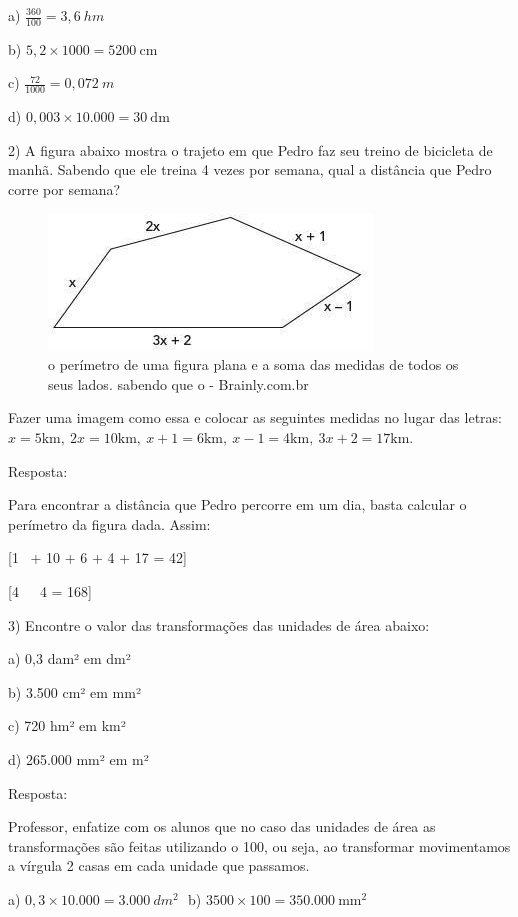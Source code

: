 a) \(\frac{360}{100} = 3,6\ hm\)

b) \(5,2 \times 1000 = 5200\ \text{cm}\)

c) \(\frac{72}{1000} = 0,072\ m\)

d) \(0,003 \times 10.000 = 30\ \text{dm}\)

2) A figura abaixo mostra o trajeto em que Pedro faz seu treino de
bicicleta de manhã. Sabendo que ele treina 4 vezes por semana, qual a
distância que Pedro corre por semana?

\begin{figure}
\centering
\includegraphics[width=3.38542in,height=1.42708in]{./imgSAEB_7_MAT/media/image86.jpg}
\caption{o perímetro de uma figura plana e a soma das medidas de todos
os seus lados. sabendo que o - Brainly.com.br}
\end{figure}

Fazer uma imagem como essa e colocar as seguintes medidas no lugar das
letras:
\(x = 5\text{km},\ 2x = 10\text{km},\ x + 1 = 6\text{km},\ x - 1 = 4\text{km},\ 3x + 2 = 17\text{km}\).

Resposta:

Para encontrar a distância que Pedro percorre em um dia, basta calcular
o perímetro da figura dada. Assim:

[1\   + 10 + 6 + 4 + 17 = 42]

[4\ \  \rightarrow \ 4  = 168]

3) Encontre o valor das transformações das unidades de área abaixo:

a) 0,3 dam² em dm²

b) 3.500 cm² em mm²

c) 720 hm² em km²

d) 265.000 mm² em m²

Resposta:

Professor, enfatize com os alunos que no caso das unidades de área as
transformações são feitas utilizando o 100, ou seja, ao transformar
movimentamos a vírgula 2 casas em cada unidade que passamos.

a)
\(0,3 \times 10.000 = 3.000\ dm^{2}\text{\ \ \ \ \ \ \ \ \ \ \ \ \ \ \ \ \ \ \ \ \ \ \ \ \ \ \ \ \ \ }\)b)
\(3500 \times 100 = 350.000\ \text{mm}^2\)

